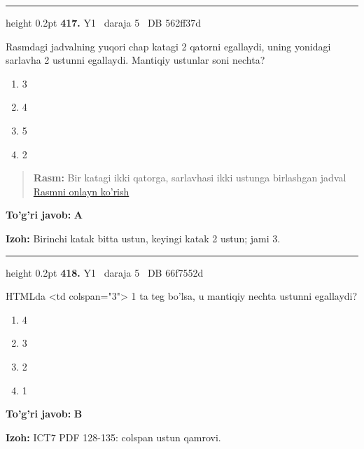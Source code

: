 \documentclass[10pt,a4paper,oneside]{article}
\begin{document}
\vspace{2mm}\hrule height 0.2pt \vspace{4mm}
\hypertarget{q417}{\textbf{\color{ink}417.}}  {\color{muted}\scriptsize Y1 \textbullet\ daraja 5 \textbullet\ DB 562ff37d}
\par
Rasmdagi jadvalning yuqori chap katagi 2 qatorni egallaydi, uning yonidagi sarlavha 2 ustunni egallaydi. Mantiqiy ustunlar soni nechta?
\begin{enumerate}[label=\Alph*),leftmargin=9mm]
\item 3
\item 4
\item 5
\item 2
\end{enumerate}
\begin{quote}\footnotesize\color{muted}\textbf{Rasm:} Bir katagi ikki qatorga, sarlavhasi ikki ustunga birlashgan jadval\\
\href{https://github.com/sarvar9417/attestatsiya/blob/main/public/graphics-web-v2/html_table.svg}{Rasmni onlayn ko'rish}
\end{quote}
\begin{tcolorbox}[enhanced,breakable,colback=teal!4,colframe=teal!45!black,boxrule=0.45pt,arc=1.2mm,left=2.8mm,right=2.8mm,top=2mm,bottom=2mm,before skip=2mm,after skip=2mm]
\textbf{\color{teal}To'g'ri javob:} \textbf{A}
\par\smallskip
\textbf{Izoh:} Birinchi katak bitta ustun, keyingi katak 2 ustun; jami 3.
\end{tcolorbox}
\vspace{2mm}\hrule height 0.2pt \vspace{4mm}
\hypertarget{q418}{\textbf{\color{ink}418.}}  {\color{muted}\scriptsize Y1 \textbullet\ daraja 5 \textbullet\ DB 66f7552d}
\par
HTMLda \textless{}td colspan="3"\textgreater{} 1 ta teg bo'lsa, u mantiqiy nechta ustunni egallaydi?
\begin{enumerate}[label=\Alph*),leftmargin=9mm]
\item 4
\item 3
\item 2
\item 1
\end{enumerate}
\begin{tcolorbox}[enhanced,breakable,colback=teal!4,colframe=teal!45!black,boxrule=0.45pt,arc=1.2mm,left=2.8mm,right=2.8mm,top=2mm,bottom=2mm,before skip=2mm,after skip=2mm]
\textbf{\color{teal}To'g'ri javob:} \textbf{B}
\par\smallskip
\textbf{Izoh:} ICT7 PDF 128-135: colspan ustun qamrovi.
\end{tcolorbox}
\end{document}
